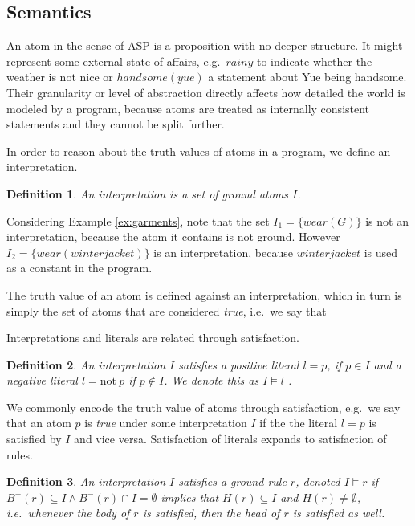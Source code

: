 \documentclass{vutinfth} %
\newtheorem{definition}{Definition}[section]
\newcommand{\headf}{H}
\newcommand{\bodyf}{B}
\newcommand{\fail}{\mathrm{not } \ \xspace}
\begin{document}
\subsection{Semantics}

An atom in the sense of ASP is a proposition with no deeper structure. It might represent some external state of affairs, e.g.~$rainy$ to indicate whether the weather is not nice or $handsome(yue)$ a statement about Yue being handsome. Their granularity or level of abstraction directly affects how detailed the world is modeled by a program, because atoms are treated as internally consistent statements and they cannot be split further.

In order to reason about the truth values of atoms in a program, we define an interpretation.

\begin{definition}
An \emph{interpretation} is a set of ground atoms $I$.
\end{definition}


Considering Example \ref{ex:garments}, note that the set $I_1 = \{ wear(G) \}$ is not an interpretation, because the atom it contains is not ground. However $I_2 = \{ wear(winterjacket) \}$ is an interpretation, because $winterjacket$ is used as a constant in the program.

The truth value of an atom is defined against an interpretation, which in turn is simply the set of atoms that are considered \emph{true}, i.e.~we say that 

Interpretations and literals are related through satisfaction.

\begin{definition}
An interpretation $I$ \emph{satisfies} a positive literal $l = p$, if $p \in I$ and a negative literal $l = \fail p$ if $p \not \in I$. We denote this as $I \models l$ .
\end{definition}

We commonly encode the truth value of atoms through satisfaction, e.g.~we say that an atom $p$ is \emph{true} under some interpretation $I$ if the the literal $l = p$ is satisfied by $I$ and vice versa. Satisfaction of literals expands to satisfaction of rules. \cite{ryan}

\begin{definition}
\label{def:rule-model}
An interpretation $I$ \emph{satisfies} a ground rule $r$, denoted $I \models r$ if $\bodyf^+(r) \subseteq I \wedge \bodyf^-(r) \cap I = \emptyset$ implies that $\headf(r) \subseteq I$ and $\headf(r) \not = \emptyset$, i.e.~whenever the body of $r$ is satisfied, then the head of $r$ is satisfied as well.
\end{definition}
\end{document}
